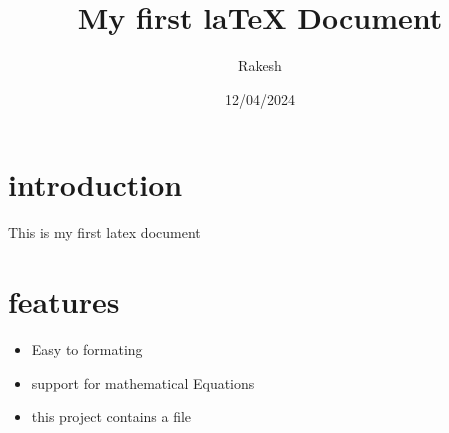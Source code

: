 \documentclass{article}
\title{My first laTeX Document}
\author{Rakesh}
\date{12/04/2024}
\begin{document}
	\maketitle
	\section{introduction}
	This is my first latex document
	\section{features}
	\begin{itemize}
		\item Easy to formating
		\item support for mathematical Equations
		\item this project contains a file
	\end{itemize}
\end{document}
